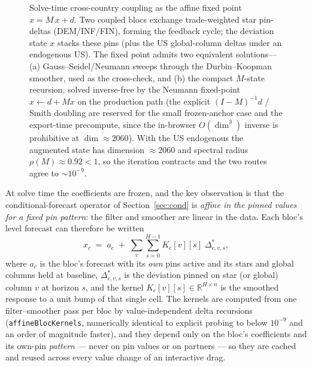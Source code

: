 \documentclass[11pt]{article}
\newcommand{\R}{\mathbb{R}}
\theoremstyle{plain}
\theoremstyle{remark}
\begin{document}
\begin{figure}[!ht]
  \caption{Solve-time cross-country coupling as the affine fixed point
    $x = M\,x + d$. Two coupled blocs exchange trade-weighted star pin-deltas
    (DEM/INF/FIN), forming the feedback cycle; the deviation state $x$ stacks
    these pins (plus the US global-column deltas under an endogenous US). The
    fixed point admits two equivalent solutions---(a) Gauss--Seidel/Neumann
    sweeps through the Durbin--Koopman smoother, used as the cross-check, and (b)
    the compact $M$-state recursion, solved inverse-free by the Neumann
    fixed-point $x\leftarrow d+Mx$ on the production path (the explicit
    $(I-M)^{-1}d$ / Smith doubling are reserved for the small frozen-anchor case
    and the export-time precompute, since the in-browser $O(\dim^{3})$ inverse is
    prohibitive at $\dim\approx 2060$). With the US endogenous the augmented
    state has dimension $\approx 2060$ and spectral radius
    $\rho(M)\approx 0.92<1$, so the iteration contracts and the two routes agree
    to $\sim 10^{-9}$.}
  \label{fig:coupling}
\end{figure}

At solve time the coefficients are frozen, and the key observation is
that the conditional-forecast operator of Section~\ref{sec:cond} is
\emph{affine in the pinned values for a fixed pin pattern}: the filter
and smoother are linear in the data. Each bloc's level forecast can
therefore be written
\begin{equation}\label{eq:kernels}
  x_c \;=\; a_c \;+\; \sum_{v}\sum_{s=0}^{H-1} K_c[v][s]\; \Delta^{*}_{c,v,s},
\end{equation}
where $a_c$ is the bloc's forecast with its \emph{own} pins active and
its stars and global columns held at baseline, $\Delta^{*}_{c,v,s}$ is
the deviation pinned on star (or global) column $v$ at horizon $s$, and
the kernel $K_c[v][s] \in \R^{H\times n}$ is the smoothed response to a
unit bump of that single cell. The kernels are computed from one
filter--smoother pass per bloc by value-independent delta recursions
(\texttt{affineBlocKernels}, numerically identical to explicit probing
to below $10^{-9}$ and an order of magnitude faster), and they depend
only on the bloc's coefficients and its own-pin \emph{pattern} --- never
on pin values or on partners --- so they are cached and reused across
every value change of an interactive drag.
\end{document}

